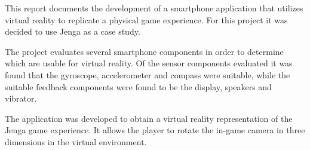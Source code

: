 
This report documents the development of a smartphone application that utilizes virtual reality to replicate a physical game experience.
For this project it was decided to use Jenga as a case study.

The project evaluates several smartphone components in order to determine which are usable for virtual reality.
Of the sensor components evaluated it was found that the gyroscope, accelerometer and compass were suitable, while the suitable feedback components were found to be the display, speakers and vibrator.

The application was developed to obtain a virtual reality representation of the Jenga game experience.
It allows the player to rotate the in-game camera in three dimensions in the virtual environment.